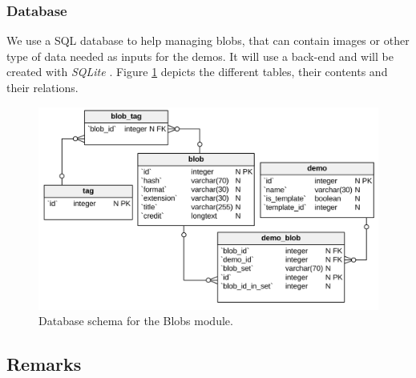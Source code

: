\subsubsection{Database}

We use a SQL database to help managing blobs, that can contain images or other 
type of data needed as inputs for the demos.
It will use a back-end and will be created with \emph{SQLite} \cite{SQLite}.
Figure \ref{img:images_bdd} depicts the different tables, their contents and their
relations.

\begin{figure}[H]
  \centering
  \includegraphics[width=\textwidth]{blobs/images/images_bdd_vertabelo}
  \caption{Database schema for the Blobs module.}
  \label{img:images_bdd}
\end{figure}

\subsection{Remarks}
